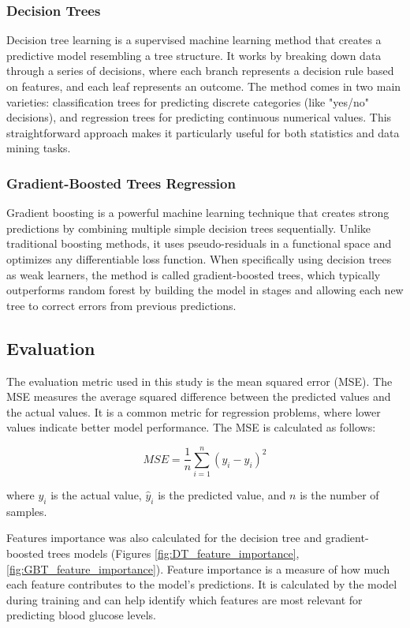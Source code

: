 \documentclass[
	a4paper, %
	10pt, %
	unnumberedsections, %
	twoside, %
]{LTJournalArticle}
\begin{document}
\subsubsection{Decision Trees}
Decision tree learning is a supervised machine learning method that creates a predictive model resembling a tree structure. It works by breaking down data through a series of decisions, where each branch represents a decision rule based on features, and each leaf represents an outcome. The method comes in two main varieties: classification trees for predicting discrete categories (like "yes/no" decisions), and regression trees for predicting continuous numerical values. This straightforward approach makes it particularly useful for both statistics and data mining tasks.


\subsubsection{Gradient-Boosted Trees Regression}
Gradient boosting is a powerful machine learning technique that creates strong predictions by combining multiple simple decision trees sequentially. Unlike traditional boosting methods, it uses pseudo-residuals in a functional space and optimizes any differentiable loss function. When specifically using decision trees as weak learners, the method is called gradient-boosted trees, which typically outperforms random forest by building the model in stages and allowing each new tree to correct errors from previous predictions.


\subsection{Evaluation}
The evaluation metric used in this study is the mean squared error (MSE). The MSE measures the average squared difference between the predicted values and the actual values. It is a common metric for regression problems, where lower values indicate better model performance. The MSE is calculated as follows:

\begin{equation}
	MSE = \frac{1}{n} \sum_{i=1}^{n} (y_i - \hat{y}_i)^2
\end{equation}

where $y_i$ is the actual value, $\hat{y}_i$ is the predicted value, and $n$ is the number of samples.

Features importance was also calculated for the decision tree and gradient-boosted trees models (Figures \ref{fig:DT_feature_importance}, \ref{fig:GBT_feature_importance}). Feature importance is a measure of how much each feature contributes to the model's predictions. It is calculated by the model during training and can help identify which features are most relevant for predicting blood glucose levels.
\end{document}

